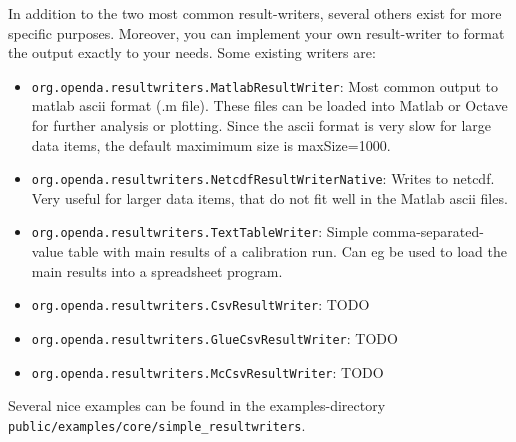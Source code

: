 In addition to the two most common result-writers, several others exist for
more specific purposes. Moreover, you can implement your own result-writer to
format the output exactly to your needs. Some existing writers are:
\begin{itemize}
\item {\tt org.openda.resultwriters.MatlabResultWriter}: Most common output to
matlab ascii format (.m file). These files can be loaded into Matlab or Octave
for further analysis or plotting. Since the ascii format is very slow for large
data items, the default maximimum size is maxSize=1000.
\item {\tt org.openda.resultwriters.NetcdfResultWriterNative}: Writes to netcdf.
Very useful for larger data items, that do not fit well in the Matlab ascii
files.
\item {\tt org.openda.resultwriters.TextTableWriter}: Simple
comma-separated-value table with main results of a calibration run. Can eg be
used to load the main results into a spreadsheet program.
\item {\tt org.openda.resultwriters.CsvResultWriter}: TODO
\item {\tt org.openda.resultwriters.GlueCsvResultWriter}: TODO
\item {\tt org.openda.resultwriters.McCsvResultWriter}: TODO
\end{itemize}


Several nice examples can be found in the examples-directory\\
{\tt public/examples/core/simple\_resultwriters}.
